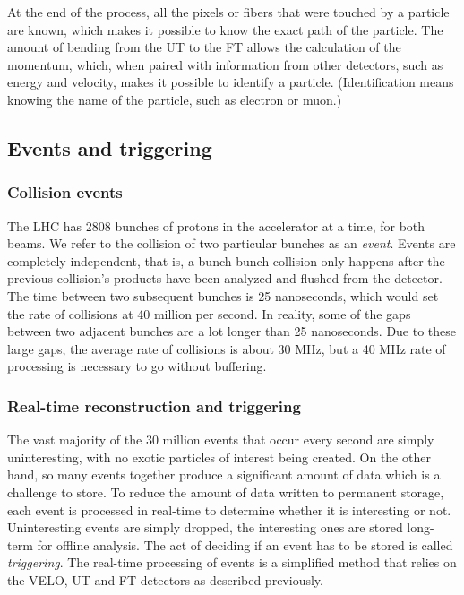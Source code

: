 \documentclass[12pt]{article}
\begin{document}
At the end of the process, all the pixels or fibers that were touched by a particle are known, which makes it possible to know the exact path of the particle. The amount of bending from the UT to the FT allows the calculation of the momentum, which, when paired with information from other detectors, such as energy and velocity, makes it possible to identify a particle. (Identification means knowing the name of the particle, such as electron or muon.)


\subsection{Events and triggering}\label{sec_events_trigger}


\subsubsection{Collision events}\label{sec_event_what}

The LHC has 2808 bunches of protons in the accelerator at a time, for both beams. We refer to the collision of two particular bunches as an \textit{event}. Events are completely independent, that is, a bunch-bunch collision only happens after the previous collision's products have been analyzed and flushed from the detector. The time between two subsequent bunches is 25 nanoseconds, which would set the rate of collisions at 40 million per second. In reality, some of the gaps between two adjacent bunches are a lot longer than 25 nanoseconds. Due to these large gaps, the average rate of collisions is about 30 MHz, but a 40 MHz rate of processing is necessary to go without buffering.


\subsubsection{Real-time reconstruction and triggering}\label{sec_trigger_what}

The vast majority of the 30 million events that occur every second are simply uninteresting, with no exotic particles of interest being created. On the other hand, so many events together produce a significant amount of data which is a challenge to store. To reduce the amount of data written to permanent storage, each event is processed in real-time to determine whether it is interesting or not. Uninteresting events are simply dropped, the interesting ones are stored long-term for offline analysis. The act of deciding if an event has to be stored is called \textit{triggering}. The real-time processing of events is a simplified method that relies on the VELO, UT and FT detectors as described previously.
\end{document}
